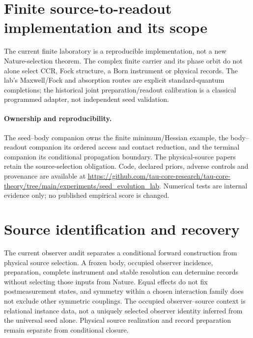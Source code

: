\documentclass[11pt]{article}
\begin{document}
\section{Finite source-to-readout implementation and its scope}
The current finite laboratory is a reproducible implementation, not a new Nature-selection theorem. The complex finite carrier and its phase orbit do not alone select CCR, Fock structure, a Born instrument or physical records. The lab's Maxwell/Fock and absorption routes are explicit standard-quantum completions; the historical joint preparation/readout calibration is a classical programmed adapter, not independent seed validation.
\paragraph{Ownership and reproducibility.}
The seed--body companion owns the finite minimum/Hessian example, the body--readout companion its ordered access and contact reduction, and the terminal companion its conditional propagation boundary. The physical-source papers retain the source-selection obligation. Code, declared priors, adverse controls and provenance are available at \url{https://github.com/tau-core-research/tau-core-theory/tree/main/experiments/seed_evolution_lab}. Numerical tests are internal evidence only; no published empirical score is changed.

\section{Source identification and recovery}
The current observer audit separates a conditional forward construction from physical source selection. A frozen body, occupied observer incidence, preparation, complete instrument and stable resolution can determine records without selecting those inputs from Nature. Equal effects do not fix postmeasurement states, and symmetry within a chosen interaction family does not exclude other symmetric couplings. The occupied observer--source context is relational instance data, not a uniquely selected observer identity inferred from the universal seed alone. Physical source realization and record preparation remain separate from conditional closure.
\end{document}
